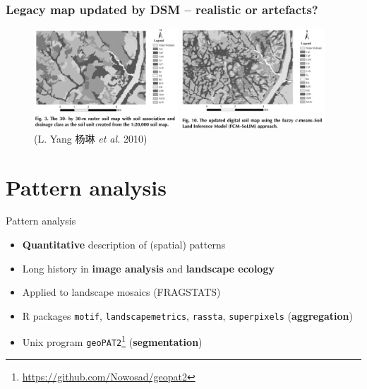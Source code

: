 \documentclass[aspectratio=169, 10pt]{beamer}
\begin{document}
\begin{frame}
  \frametitle{Legacy map updated by DSM -- realistic or artefacts?}
    \begin{figure}
        {\centering
        \includegraphics[width=0.48\textwidth]{./graphics_david/sssaj2010.0002_YL_original.png}
        \hfill
        \includegraphics[width=0.48\textwidth]{./graphics_david/sssaj2010.0002_YL_updated.png}
        }\\\flushleft(L. Yang 杨琳 \emph{et al.} 2010)  
    \end{figure}
\end{frame}


\section{Pattern analysis}

\begin{frame}{Pattern analysis}
    \begin{itemize}
        \item \textbf{Quantitative} description of (spatial) patterns
        \item Long history in \textbf{image analysis} and \textbf{landscape ecology}
        \item Applied to landscape mosaics (FRAGSTATS)
        \item R packages  \texttt{motif}, \texttt{landscapemetrics}, \texttt{rassta}, \texttt{superpixels} (\textbf{aggregation})
        \item Unix program \texttt{geoPAT2}\footnote{\url{https://github.com/Nowosad/geopat2}} (\textbf{segmentation})
   \end{itemize}
\end{frame}
\end{document}
